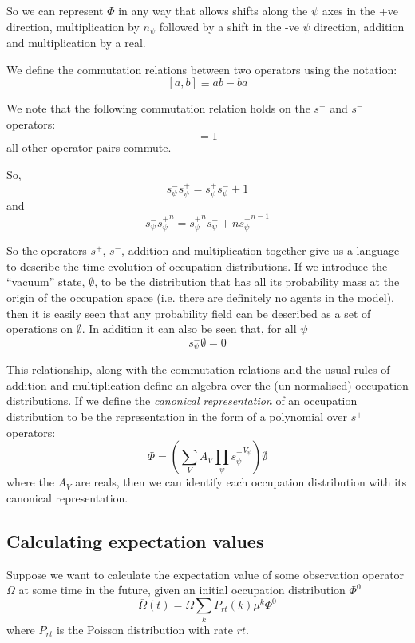 \documentclass[a4paper]{article}
\begin{document}
So we can represent $\Phi$ in any way that allows shifts along the $\psi$ axes in the +ve direction, multiplication by $n_\psi$ followed by a shift in the -ve $\psi$ direction, addition and multiplication by a real.

We define the commutation relations between two operators using the notation:
\[
[a,b] \equiv ab - ba
\]

We note that the following commutation relation holds on the $s^+$ and $s^-$ operators:
\begin{equation}
[s^-_\psi, s^+_\psi] = 1
\label{commutationEq}
\end{equation}
all other operator pairs commute.

So,
\[
s^-_\psi s^+_\psi = s^+_\psi s^-_\psi + 1
\]
and
\[
s^-_\psi \left.s^+_\psi\right.^n = \left.s^+_\psi\right.^n s^-_\psi  + n\left.s^+_\psi\right.^{n-1}
\]

So the operators $s^+$, $s^-$, addition and multiplication together give us a language to describe the time evolution of occupation distributions. If we introduce the ``vacuum'' state, $\emptyset$, to be the distribution that has all its probability mass at the origin of the occupation space (i.e. there are definitely no agents in the model), then it is easily seen that any probability field can be described as a set of operations on $\emptyset$. In addition it can also be seen that, for all $\psi$
\[
s^-_\psi\emptyset = 0
\]

This relationship, along with the commutation relations and the usual rules of addition and multiplication define an algebra over the (un-normalised) occupation distributions. If we define the \textit{canonical representation} of an occupation distribution to be the representation in the form of a polynomial over $s^+$ operators:
\[
\Phi = \left(\sum_V A_V\prod_\psi \left.s^+_\psi\right.^{V_\psi} \right)\emptyset
\]
where the $A_V$ are reals, then we can identify each occupation distribution with its canonical representation.

\subsection{Calculating expectation values}

Suppose we want to calculate the expectation value of some observation operator $\Omega$ at some time in the future, given an initial occupation distribution $\Phi^0$
\[
\bar{\Omega}(t) = \Omega \sum_{k} P_{rt}(k)\mu^k \Phi^0
\]
where $P_{rt}$ is the Poisson distribution with rate $rt$.
\end{document}

